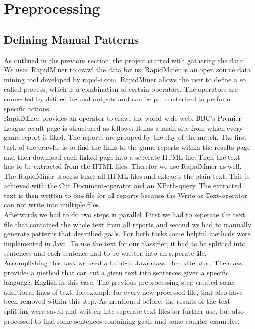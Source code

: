 \documentclass[11pt,titlepage,oneside,openany]{book}
\begin{document}
\section{Preprocessing}
\label{sec:preproc}
\subsection{Defining Manual Patterns}
As outlined in the previous section, the project started with gathering the data. We used RapidMiner to crawl the data for us. RapidMiner is an open source data mining tool developed by rapid-i.com. RapidMiner allows the user to define a so called process, which is a combination of certain operators. The operators are connected by defined in- and outputs and can be parameterized to perform specific actions. \\
RapidMiner provides an operator to crawl the world wide web. BBC's Premier League result page is structured as follows: It has a main site from which every game report is liked. The reports are grouped by the day of the match. The first task of the crawler is to find the links to the game reports within the results page and then download each linked page into a seperate HTML file. Then the text has to be extracted from the HTML files. Therefor we use RapidMiner as well. The RapidMiner process takes all HTML files and extracts the plain text. This is achieved with the Cut Document-operator and an XPath-query. The extracted text is then written to one file for all reports because the Write as Text-operator can not write into multiple files. \\ 

Afterwards we had to do two steps in parallel. First we had to seperate the text file that contained the whole text from all reports and second we had to manually generate patterns that described goals.
For both tasks some helpful methods were implemented in Java. To use the text for our classifier, it had to be splitted into sentences and each sentence had to be written into an seperate file. Accomplishing this task we used a build-in Java class: BreakIterator. The class provides a method that can cut a given text into sentences given a specific language, English in this case. The previous preprocessing step created some additional lines of text, for example for every new processed file, that also have been removed within this step. As mentioned before, the results of the text splitting were saved and written into seperate text files for further use, but also processed to find some sentences containing goals and some counter examples. \\
\end{document}
